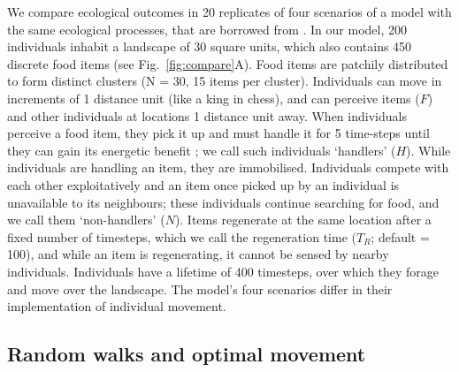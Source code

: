 We compare ecological outcomes in 20 replicates of four scenarios of a model with the same ecological processes, that are borrowed from \citet{gupte2022c}.
In our model, 200 individuals inhabit a landscape of 30 square units, which also contains 450 discrete food items (see Fig.~\ref{fig:compare}A).
Food items are patchily distributed to form distinct clusters (N = 30, 15 items per cluster).
Individuals can move in increments of 1 distance unit (like a king in chess), and can perceive items ($F$) and other individuals at locations 1 distance unit away.
When individuals perceive a food item, they pick it up and must handle it for 5 time-steps until they can gain its energetic benefit \citep{ruxton1992,gupte2021a,gupte2022c}; we call such individuals `handlers' ($H$).
While individuals are handling an item, they are immobilised.
Individuals compete with each other exploitatively and an item once picked up by an individual is unavailable to its neighbours; these individuals continue searching for food, and we call them `non-handlers' ($N$).
Items regenerate at the same location after a fixed number of timesteps, which we call the regeneration time ($T_R$; default = 100), and while an item is regenerating, it cannot be sensed by nearby individuals.
Individuals have a lifetime of 400 timesteps, over which they forage and move over the landscape.
The model's four scenarios differ in their implementation of individual movement.

\subsection*{Random walks and optimal movement}

